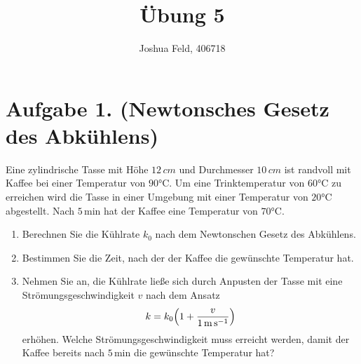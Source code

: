 \documentclass[german,12pt]{homework}
\title{Übung 5}
\author{Joshua Feld, 406718}
\institute{RWTH Aachen University\\Aachener Verfahrenstechnik}
\DeclarePairedDelimiter{\enbrace}{(}{)}
\newcommand{\degC}{\si{\degreeCelsius}}
\begin{document}
    \maketitle

    \section*{Aufgabe 1. (Newtonsches Gesetz des Abkühlens)}

    \begin{problem}
        Eine zylindrische Tasse mit Höhe \(12\,\si{cm}\) und Durchmesser
        \(10\,\si{cm}\) ist randvoll mit Kaffee bei einer Temperatur von
        \(90\degC\). Um eine Trinktemperatur von \(60\degC\) zu erreichen wird
        die Tasse in einer Umgebung mit einer Temperatur von \(20\degC\)
        abgestellt. Nach \(5\,\si{\minute}\) hat der Kaffee eine Temperatur von
        \(70\degC\).
        \begin{enumerate}
            \item Berechnen Sie die Kühlrate \(k_0\) nach dem Newtonschen
            Gesetz des Abkühlens.
            \item Bestimmen Sie die Zeit, nach der der Kaffee die gewünschte
            Temperatur hat.
            \item Nehmen Sie an, die Kühlrate ließe sich durch Anpusten der
            Tasse mit eine Strömungsgeschwindigkeit \(v\) nach dem Ansatz
            \[k = k_0\enbrace*{1 + \frac{v}{1\,\si{\metre\per\second}}}\]
            erhöhen. Welche Strömungsgeschwindigkeit muss erreicht werden,
            damit der Kaffee bereits nach \(5\,\si{\minute}\) die gewünschte
            Temperatur hat?
        \end{enumerate}
    \end{problem}
\end{document}
